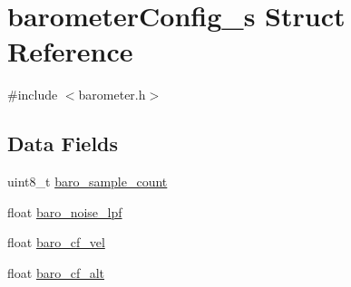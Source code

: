 \hypertarget{structbarometerConfig__s}{\section{barometer\+Config\+\_\+s Struct Reference}
\label{structbarometerConfig__s}
}


{\ttfamily \#include $<$barometer.\+h$>$}

\subsection*{Data Fields}
\begin{DoxyCompactItemize}
\item 
uint8\+\_\+t \hyperlink{structbarometerConfig__s_a8cfcc500e3be079ed3fcb6990640cded}{baro\+\_\+sample\+\_\+count}
\item 
float \hyperlink{structbarometerConfig__s_ae20135deb6dd6bf45b423ce09d3e687b}{baro\+\_\+noise\+\_\+lpf}
\item 
float \hyperlink{structbarometerConfig__s_a6d480e4e6a8a2d631faa3d318f1bcc46}{baro\+\_\+cf\+\_\+vel}
\item 
float \hyperlink{structbarometerConfig__s_aaed2057a8ff4cdbb214b6b79861e84f0}{baro\+\_\+cf\+\_\+alt}
\end{DoxyCompactItemize}


